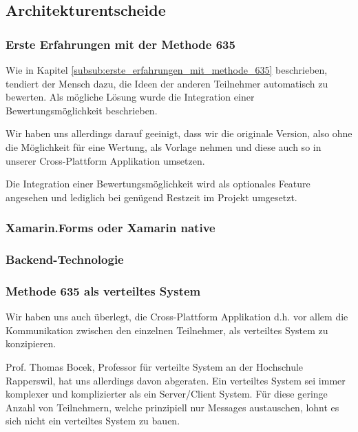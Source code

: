 \subsection{Architekturentscheide}

\subsubsection{Erste Erfahrungen mit der Methode 635}
Wie in Kapitel \ref{subsub:erste_erfahrungen_mit_methode_635} beschrieben, tendiert der Mensch dazu, die Ideen der anderen Teilnehmer automatisch zu bewerten. Als mögliche Lösung wurde die Integration einer Bewertungsmöglichkeit beschrieben.


Wir haben uns allerdings darauf geeinigt, dass wir die originale Version, also ohne die Möglichkeit für eine Wertung, als Vorlage nehmen und diese auch so in unserer Cross-Plattform Applikation umsetzen. 


Die Integration einer Bewertungsmöglichkeit wird als optionales Feature angesehen und lediglich bei genügend Restzeit im Projekt umgesetzt.

\subsubsection{Xamarin.Forms oder Xamarin native}

\subsubsection{Backend-Technologie}

\subsubsection{Methode 635 als verteiltes System}
Wir haben uns auch überlegt, die Cross-Plattform Applikation d.h. vor allem die Kommunikation zwischen den einzelnen Teilnehmer, als verteiltes System zu konzipieren.


Prof. Thomas Bocek, Professor für verteilte System an der Hochschule Rapperswil, hat uns allerdings davon abgeraten. Ein verteiltes System sei immer komplexer und komplizierter als ein Server/Client System. Für diese geringe Anzahl von Teilnehmern, welche prinzipiell nur Messages austauschen, lohnt es sich nicht ein verteiltes System zu bauen. 


